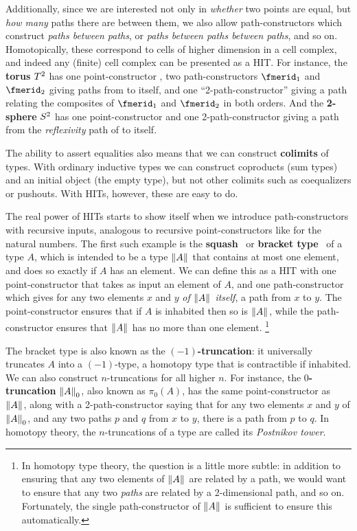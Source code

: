 \documentclass{amsart}
\begin{document}
Additionally, since we are interested not only in \emph{whether} two points are equal, but \emph{how many} paths there are between them, we also allow path-constructors which construct \emph{paths between paths}, or \emph{paths between paths between paths}, and so on.
Homotopically, these correspond to cells of higher dimension in a cell complex, and indeed any (finite) cell complex can be presented as a HIT.
For instance, the \textbf{torus} $\torustype$ has one point-constructor \fbase, two path-constructors $\fmerid_1$ and $\fmerid_2$ giving paths from \fbase to itself, and one ``2-path-constructor'' giving a path relating the composites of $\fmerid_1$ and $\fmerid_2$ in both orders.
And the \textbf{2-sphere} $\spheretype 2$ has one point-constructor \fbase and one 2-path-constructor \fsurf giving a path from the \emph{reflexivity} path of \fbase to itself.

The ability to assert equalities also means that we can construct \textbf{colimits} of types.
With ordinary inductive types we can construct coproducts (sum types) and an initial object (the empty type), but not other colimits such as coequalizers or pushouts.
With HITs, however, these are easy to do.

The real power of HITs starts to show itself when we introduce path-constructors with recursive inputs, analogous to recursive point-constructors like \fsucc for the natural numbers.
The first such example is the \textbf{squash}~\cite{nuprlbook} or \textbf{bracket type}~\cite{ab:bracket-types} of a type $A$, which is intended to be a type $\brck{A}$ that contains at most one element, and does so exactly if $A$ has an element.
We can define this as a HIT with one point-constructor that takes as input an element of $A$, and one path-constructor which gives for any two elements $x$ and $y$ \emph{of $\brck{A}$ itself}, a path from $x$ to $y$.
The point-constructor ensures that if $A$ is inhabited then so is $\brck{A}$, while the path-constructor ensures that $\brck{A}$ has no more than one element.%
\footnote{In homotopy type theory, the question is a little more subtle: in addition to ensuring that any two elements of $\brck{A}$ are related by a path, we would want to ensure that any two \emph{paths} are related by a 2-dimensional path, and so on.
  Fortunately, the single path-constructor of $\brck{A}$ is sufficient to ensure this automatically.}

The bracket type is also known as the \textbf{$(-1)$-truncation}: it universally truncates $A$ into a $(-1)$-type, a homotopy type that is contractible if inhabited.
We can also construct $n$-truncations for all higher $n$.
For instance, the \textbf{$0$-truncation} $\trunc 0 A$, also known as $\pi_0(A)$, has the same point-constructor as $\brck{A}$, along with a 2-path-constructor saying that for any two elements $x$ and $y$ of $\trunc 0 A$, and any two paths $p$ and $q$ from $x$ to $y$, there is a path from $p$ to $q$.
In homotopy theory, the $n$-truncations of a type are called its \emph{Postnikov tower}.
\end{document}
